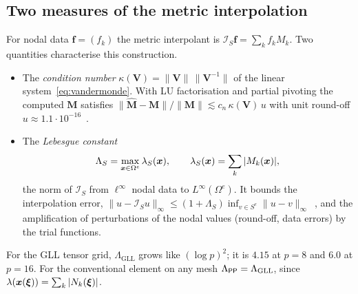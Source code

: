 \subsection{Two measures of the metric interpolation}
For nodal data $\bm f=(f_k)$ the metric interpolant is $\mathcal I_S\bm f=\sum_kf_kM_k$. Two
quantities characterise this construction.
\begin{itemize}
\item The \emph{condition number} $\kappa(\bm V)=\|\bm V\|\,\|\bm V^{-1}\|$ of the linear
  system~\eqref{eq:vandermonde}. With LU factorisation and partial pivoting the computed
  $\hat{\bm M}$ satisfies $\|\hat{\bm M}-\bm M\|/\|\bm M\|\lesssim c_n\,\kappa(\bm V)\,u$ with
  unit round-off $u\approx1.1\cdot10^{-16}$~\cite{Higham2002Accuracy}.
\item The \emph{Lebesgue constant}
  \begin{equation}
    \Lambda_S=\max_{\bm{x}\in\Omega^e}\lambda_S(\bm{x}),\qquad \lambda_S(\bm{x})=\sum_k|M_k(\bm{x})| ,
  \end{equation}
  the norm of $\mathcal I_S$ from $\ell^\infty$ nodal data to $L^\infty(\Omega^e)$. It bounds the
  interpolation error, $\|u-\mathcal I_Su\|_\infty\le(1+\Lambda_S)\inf_{v\in
  S^e}\|u-v\|_\infty$~\cite{Brutman1997Lebesgue}, and the amplification of perturbations of the
  nodal values (round-off, data errors) by the trial functions.
\end{itemize}
For the GLL tensor grid, $\Lambda_{\mathrm{GLL}}$ grows like $(\log p)^2$; it is $4.15$ at $p=8$
and $6.0$ at $p=16$. For the conventional element on any mesh $\Lambda_{\textsf{PP}}=\Lambda_{\mathrm{GLL}}$,
since $\lambda(\bm{x}(\bm{\xi}))=\sum_k|N_k(\bm{\xi})|$.
